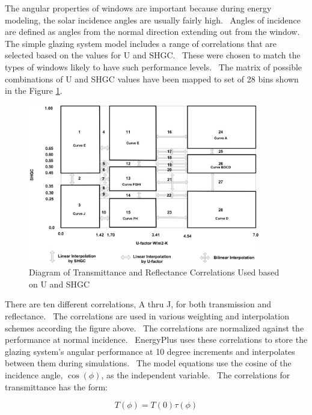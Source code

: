 The angular properties of windows are important because during energy modeling, the solar incidence angles are usually fairly high.~ Angles of incidence are defined as angles from the normal direction extending out from the window.~ The simple glazing system model includes a range of correlations that are selected based on the values for U and SHGC.~ These were chosen to match the types of windows likely to have such performance levels.~ The matrix of possible combinations of U and SHGC values have been mapped to set of 28 bins shown in the Figure \ref{fig:diagram-of-transmittance-and}.

\begin{figure}[hbtp] %
\centering
\includegraphics[width=0.9\textwidth, height=0.9\textheight, keepaspectratio=true]{media/image947.png}
\caption{Diagram of Transmittance and Reflectance Correlations Used based on U and SHGC \label{fig:diagram-of-transmittance-and}}
\end{figure}

There are ten different correlations, A thru J, for both transmission and reflectance.~ The correlations are used in various weighting and interpolation schemes according the figure above.~ The correlations are normalized against the performance at normal incidence.~ EnergyPlus uses these correlations to store the glazing system's angular performance at 10 degree increments and interpolates between them during simulations.~ The model equations use the cosine of the incidence angle, \(\cos (\phi )\), as the independent variable.~ The correlations for transmittance has the form:

\begin{equation}
  T(\phi) = T(0) \tau (\phi )
\end{equation}

